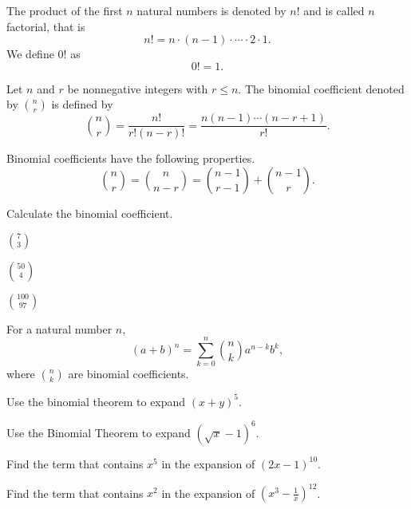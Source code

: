 \begin{definition}
The product of the first $n$ natural numbers is denoted by $n!$ and is called $n$ factorial, that is
\[n!=n\cdot (n-1)\cdot \cdots \cdot 2\cdot 1.\]
We define $0!$ as
\[0!=1.\]
\end{definition}

\begin{definition}
    Let $n$ and $r$ be nonnegative integers with $r\le n$. The binomial coefficient denoted by $\binom{n}{r}$ is defined by
    \[\binom{n}{r}=\dfrac{n!}{r!(n-r)!}=\dfrac{n(n-1)\cdots(n-r+1)}{r!}.\]
\end{definition}

\begin{theorem} Binomial coefficients have the following properties.
    \[\binom{n}{r}=\binom{n}{n-r}=\binom{n-1}{r-1}+\binom{n-1}{r}.\]
\end{theorem}

\begin{example}
    Calculate the binomial coefficient.\\
    \begin{enumerate*}
        \item $\binom{7}{3}$
        \item $\binom{50}{4}$
        \item $\binom{100}{97}$\hfill\null
    \end{enumerate*}
\end{example}

\newpage

\begin{theorem}
For a natural number $n$, 
\[
(a+b)^n = \sum_{k=0}^n \binom{n}{k} a^{n-k} b^{k},
\]
where $\binom{n}{k}$ are binomial coefficients.
\end{theorem}

\begin{example}
    Use the binomial theorem to expand $(x+y)^5$.
\end{example}

\begin{example}
    Use the Binomial Theorem to expand $(\sqrt{x}-1)^6$.
\end{example}

\begin{example}
    Find the term that contains $x^5$ in the expansion of $(2x-1)^{10}$.
\end{example}

\begin{example}
    Find the term that contains $x^2$ in the expansion of $\left(x^3-\frac{1}{x}\right)^{12}$.
\end{example}

